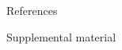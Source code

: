\documentclass[8pt]{beamer}\usepackage[]{graphicx}\usepackage[]{color}
\begin{document}


\begin{frame}{References}

    \footnotesize
    
    
    \begingroup
    \renewcommand{\section}[2]{}%
    
    \endgroup
    
\end{frame}
    

\begin{frame}
    \huge{Supplemental material}
\end{frame}

\end{document}
